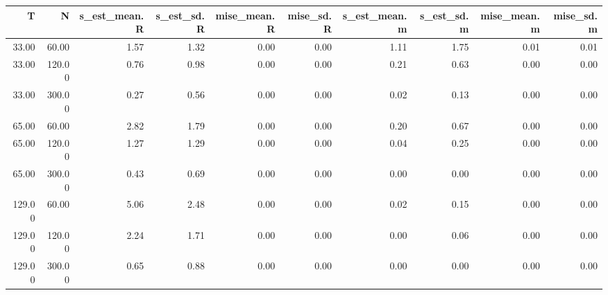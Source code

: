 \begin{table}[ht]
\centering
\begin{tabular}{rrrrrrrrrr}
  \hline
T & N & s\_est\_mean.R & s\_est\_sd.R & mise\_mean.R & mise\_sd.R & s\_est\_mean.m & s\_est\_sd.m & mise\_mean.m & mise\_sd.m \\ 
  \hline
33.00 & 60.00 & 1.57 & 1.32 & 0.00 & 0.00 & 1.11 & 1.75 & 0.01 & 0.01 \\ 
  33.00 & 120.00 & 0.76 & 0.98 & 0.00 & 0.00 & 0.21 & 0.63 & 0.00 & 0.00 \\ 
  33.00 & 300.00 & 0.27 & 0.56 & 0.00 & 0.00 & 0.02 & 0.13 & 0.00 & 0.00 \\ 
  65.00 & 60.00 & 2.82 & 1.79 & 0.00 & 0.00 & 0.20 & 0.67 & 0.00 & 0.00 \\ 
  65.00 & 120.00 & 1.27 & 1.29 & 0.00 & 0.00 & 0.04 & 0.25 & 0.00 & 0.00 \\ 
  65.00 & 300.00 & 0.43 & 0.69 & 0.00 & 0.00 & 0.00 & 0.00 & 0.00 & 0.00 \\ 
  129.00 & 60.00 & 5.06 & 2.48 & 0.00 & 0.00 & 0.02 & 0.15 & 0.00 & 0.00 \\ 
  129.00 & 120.00 & 2.24 & 1.71 & 0.00 & 0.00 & 0.00 & 0.06 & 0.00 & 0.00 \\ 
  129.00 & 300.00 & 0.65 & 0.88 & 0.00 & 0.00 & 0.00 & 0.00 & 0.00 & 0.00 \\ 
   \hline
\end{tabular}
\end{table}
